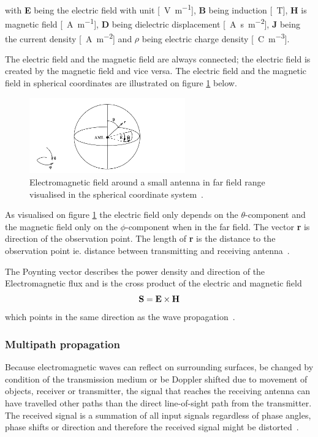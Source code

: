 with \textbf{E} being the electric field with unit [\SI{}{\volt\per\meter}], \textbf{B} being induction [\SI{}{\tesla}], \textbf{H} is magnetic field [\SI{}{\ampere\per\meter}], \textbf{D} being dielectric displacement [\SI{}{\ampere\second\per\meter\squared}], \textbf{J} being the current density [\SI{}{\ampere\per\meter\squared}] and $\rho$ being electric charge density [\SI{}{\coulomb\per\meter\cubed}].

The electric field and the magnetic field are always connected; the electric field is created by the magnetic field and vice versa. The electric field and the magnetic field in spherical coordinates are illustrated on figure \ref{fig:em_field} below.
\begin{figure}[H]
    \centering
    \includegraphics[width=0.6\textwidth]{figures/em_polar_coordinates.png}
    \caption{Electromagnetic field around a small antenna in far field range visualised in the spherical coordinate system~\cite[p. 58]{maxwell_theory}.} \label{fig:em_field}
\end{figure}

As visualised on figure \ref{fig:em_field} the electric field only depends on the $\theta$-component and the magnetic field only on the $\phi$-component when in the far field. The vector \textbf{r} is direction of the observation point. The length of \textbf{r} is the distance to the observation point ie. distance between transmitting and receiving antenna~\cite[p. 59]{maxwell_theory}.

The Poynting vector describes the power density and direction of the Electromagnetic flux and is the cross product of the electric and magnetic field 
\begin{equation}
    \textbf{S} = \textbf{E} \times \textbf{H}
    \tagaddtext{[\si{\watt\per\meter\squared}]}
\end{equation}
which points in the same direction as the wave propagation~\cite[p. 3]{ant_beam_form}. 

\subsubsection{Multipath propagation}
Because electromagnetic waves can reflect on surrounding surfaces, be changed by condition of the transmission medium or be Doppler shifted due to movement of objects, receiver or transmitter, the signal that reaches the receiving antenna can have travelled other paths than the direct line-of-sight path from the transmitter. The received signal is a summation of all input signals regardless of phase angles, phase shifts or direction and therefore the received signal might be distorted~\cite[pp. 1-2]{itu_multipath}. 

